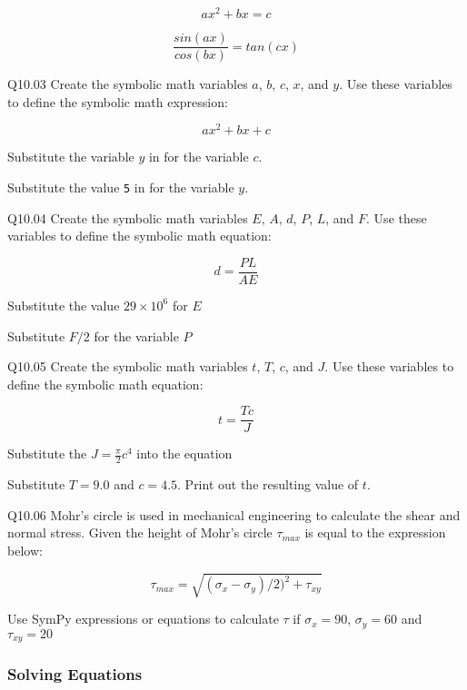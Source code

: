 \documentclass{book}
\newcommand{\passthrough}[1]{#1}
\begin{document}
\[ ax^2 + bx = c \]

\[ \frac{sin(ax)}{cos(bx)} = tan(cx) \]

Q10.03 Create the symbolic math variables \(a\), \(b\), \(c\), \(x\),
and \(y\). Use these variables to define the symbolic math expression:

\[ ax^2 + bx + c \]

Substitute the variable \(y\) in for the variable \(c\).

Substitute the value \passthrough{\lstinline!5!} in for the variable
\(y\).

Q10.04 Create the symbolic math variables \(E\), \(A\), \(d\), \(P\),
\(L\), and \(F\). Use these variables to define the symbolic math
equation:

\[ d = \frac{PL}{AE} \]

Substitute the value \(29 \times 10^6\) for \(E\)

Substitute \(F/2\) for the variable \(P\)

Q10.05 Create the symbolic math variables \(t\), \(T\), \(c\), and
\(J\). Use these variables to define the symbolic math equation:

\[ t = \frac{Tc}{J} \]

Substitute the \(J = \frac{\pi}{2}c^4\) into the equation

Substitute \(T=9.0\) and \(c=4.5\). Print out the resulting value of
\(t\).

Q10.06 Mohr's circle is used in mechanical engineering to calculate the
shear and normal stress. Given the height of Mohr's circle
\(\tau_{max}\) is equal to the expression below:

\[ \tau_{max} = \sqrt{(\sigma_x - \sigma_y)/2)^2 + \tau_{xy}} \]

Use SymPy expressions or equations to calculate \(\tau\) if
\(\sigma_x = 90\), \(\sigma_y = 60\) and \(\tau_{xy} = 20\)
    




    
        \hypertarget{solving-equations}{%
\subsubsection{Solving Equations}\label{solving-equations}}
    
\end{document}
